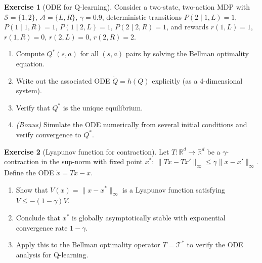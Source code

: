 \documentclass[11pt,a4paper]{article}
\theoremstyle{definition}
\newtheorem{exercise}{Exercise}[section]
\theoremstyle{plain}
\theoremstyle{remark}
\newcommand{\R}{\mathbb{R}}
\begin{document}
\begin{exercise}[ODE for Q-learning]
\label{ex:ode-qlearning}
Consider a two-state, two-action MDP with $\mathcal{S} = \{1, 2\}$,
$\mathcal{A} = \{L, R\}$, $\gamma = 0.9$, deterministic transitions
$P(2 \mid 1, L) = 1$, $P(1 \mid 1, R) = 1$, $P(1 \mid 2, L) = 1$,
$P(2 \mid 2, R) = 1$, and rewards $r(1, L) = 1$, $r(1, R) = 0$,
$r(2, L) = 0$, $r(2, R) = 2$.
\begin{enumerate}[label=(\alph*)]
\item Compute $Q^*(s, a)$ for all $(s, a)$ pairs by solving the Bellman optimality
  equation.
\item Write out the associated ODE $\dot{Q} = h(Q)$ explicitly (as a 4-dimensional
  system).
\item Verify that $Q^*$ is the unique equilibrium.
\item \emph{(Bonus)} Simulate the ODE numerically from several initial conditions
  and verify convergence to $Q^*$.
\end{enumerate}
\end{exercise}

\begin{exercise}[Lyapunov function for contraction]
\label{ex:lyapunov-contraction}
Let $T : \R^d \to \R^d$ be a $\gamma$-contraction in the sup-norm with fixed point
$x^*$: $\|Tx - Tx'\|_\infty \leq \gamma \|x - x'\|_\infty$. Define the ODE
$\dot{x} = Tx - x$.
\begin{enumerate}[label=(\alph*)]
\item Show that $V(x) = \|x - x^*\|_\infty$ is a Lyapunov function satisfying
  $\dot{V} \leq -(1-\gamma) V$.
\item Conclude that $x^*$ is globally asymptotically stable with exponential
  convergence rate $1 - \gamma$.
\item Apply this to the Bellman optimality operator $T = \mathcal{T}^*$ to verify
  the ODE analysis for Q-learning.
\end{enumerate}
\end{exercise}
\end{document}
